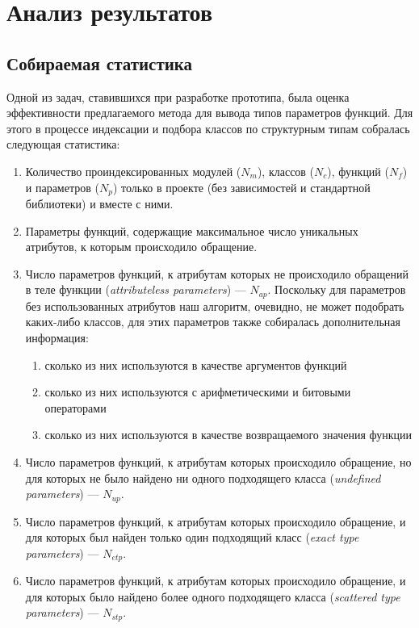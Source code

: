 \chapter{Анализ результатов}

\section{Собираемая статистика}
\label{sec:statistics-collecting}

Одной из задач, ставившихся при разработке прототипа, была оценка эффективности
предлагаемого метода для вывода типов параметров функций. Для этого в процессе
индексации и подбора классов по структурным типам собралась следующая
статистика:

\begin{enumerate}
  \item Количество проиндексированных модулей ($N_m$), классов ($N_c$), функций
    ($N_f$) и параметров ($N_p$) только в проекте (без зависимостей и
    стандартной библиотеки) и вместе с ними.

  \item Параметры функций, содержащие максимальное число уникальных атрибутов, к
    которым происходило обращение.

  \item Число параметров функций, к атрибутам которых не происходило обращений в
    теле функции (\emph{attributeless parameters}) --- $N_{ap}$.
    Поскольку для параметров без использованных атрибутов наш алгоритм,
    очевидно, не может подобрать каких-либо классов, для этих параметров также
    собиралась дополнительная информация:
    
    \begin{enumerate}
        \item сколько из них используются в качестве аргументов функций
        \item сколько из них используются с арифметическими и битовыми операторами
        \item сколько из них используются в качестве возвращаемого значения функции
    \end{enumerate}

  \item Число параметров функций, к атрибутам которых происходило обращение, но для
    которых не было найдено ни одного подходящего класса (\emph{undefined
      parameters}) --- $N_{up}$.

  \item Число параметров функций, к атрибутам которых происходило обращение, и для
    которых был найден только один подходящий класс (\emph{exact type parameters}) 
    --- $N_{etp}$.

  \item Число параметров функций, к атрибутам которых происходило обращение, и для
    которых было найдено более одного подходящего класса (\emph{scattered type
      parameters}) --- $N_{stp}$.

\end{enumerate}

